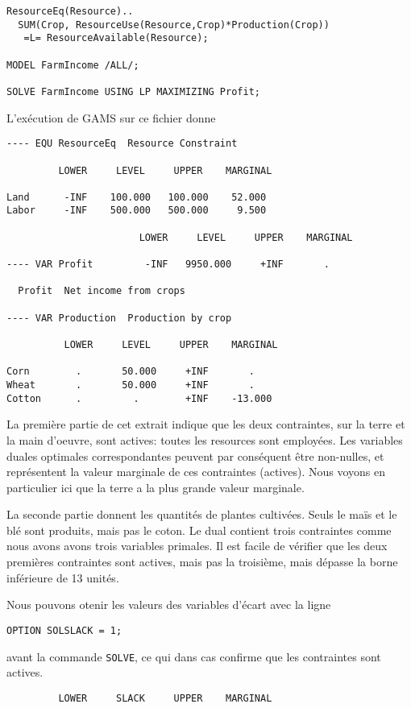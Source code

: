 \begin{example}
\begin{verbatim}
ResourceEq(Resource)..
  SUM(Crop, ResourceUse(Resource,Crop)*Production(Crop))
   =L= ResourceAvailable(Resource);

MODEL FarmIncome /ALL/;

SOLVE FarmIncome USING LP MAXIMIZING Profit;
\end{verbatim}
L'exécution de GAMS sur ce fichier donne
\begin{verbatim}
---- EQU ResourceEq  Resource Constraint

         LOWER     LEVEL     UPPER    MARGINAL

Land      -INF    100.000   100.000    52.000      
Labor     -INF    500.000   500.000     9.500      

                       LOWER     LEVEL     UPPER    MARGINAL

---- VAR Profit         -INF   9950.000     +INF       .         

  Profit  Net income from crops

---- VAR Production  Production by crop

          LOWER     LEVEL     UPPER    MARGINAL

Corn        .       50.000     +INF       .         
Wheat       .       50.000     +INF       .         
Cotton      .         .        +INF    -13.000      
\end{verbatim}

La première partie de cet extrait indique que les deux contraintes, sur la terre et la main d'oeuvre, sont actives: toutes les resources sont employées.
Les variables duales optimales correspondantes peuvent par conséquent être non-nulles, et représentent la valeur marginale de ces contraintes (actives).
Nous voyons en particulier ici que la terre a la plus grande valeur marginale.

La seconde partie donnent les quantités de plantes cultivées.
Seuls le maïs et le blé sont produits, mais pas le coton.
Le dual contient trois contraintes comme nous avons avons trois variables primales.
Il est facile de vérifier que les deux premières contraintes sont actives, mais pas la troisième, mais dépasse la borne inférieure de 13 unités.

Nous pouvons otenir les valeurs des variables d'écart avec la ligne
\begin{verbatim}
OPTION SOLSLACK = 1;
\end{verbatim}
avant la commande \verb|SOLVE|, ce qui dans cas confirme que les contraintes sont actives.
\begin{verbatim}
         LOWER     SLACK     UPPER    MARGINAL


\end{verbatim}
\end{example}
